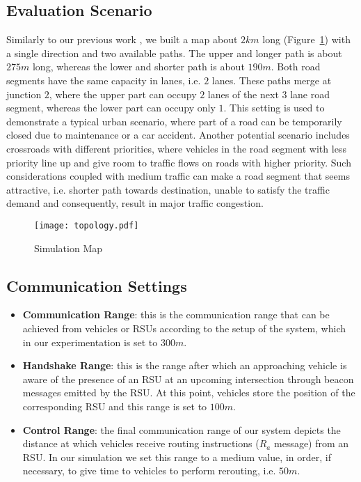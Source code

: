 \documentclass[conference]{IEEEtran}
\begin{document}
\subsection{Evaluation Scenario}
Similarly to our previous work \cite{maglaras2013exploiting}, we built a map about $2km$ long (Figure~\ref{map}) with a single direction and two available paths. The upper and longer path is about $275m$ long, whereas the lower and shorter path is about $190m$. Both road segments have the same capacity in lanes, i.e. $2$ lanes. These paths merge at junction $2$, where the upper part can occupy $2$ lanes of the next $3$ lane road segment, whereas the lower part can occupy only $1$. This setting is used to demonstrate a typical urban scenario, where part of a road can be temporarily closed due to maintenance or a car accident. Another potential scenario includes crossroads with different priorities, where vehicles in the road segment with less priority line up and give room to traffic flows on roads with higher priority. Such considerations coupled with medium traffic can make a road segment that seems attractive, i.e. shorter path towards destination, unable to satisfy the traffic demand and consequently, result in major traffic congestion. 

\begin{figure}[b]
  \centering
     \texttt{[image: topology.pdf]}
  \caption{Simulation Map}
  \label{map}
\end{figure}

\subsection{Communication Settings}

\begin{itemize}
\item {\bf Communication Range}: this is the communication range that can be achieved from vehicles or RSUs according to the setup of the system, which in our experimentation is set to $300m$.
\item {\bf Handshake Range}: this is the range after which an approaching vehicle is aware of the presence of an RSU at an upcoming intersection through beacon
messages emitted by the RSU. At this point, vehicles store the position of the corresponding RSU and this range is set to $100m$.
\item {\bf Control Range}: the final communication range of our system depicts the distance at which vehicles receive routing instructions ($R_a$ message) from an RSU.
In our simulation we set this range to a medium value, in order, if necessary, to give time to vehicles to perform rerouting, i.e. $50m$.
\end{itemize}
\end{document}
